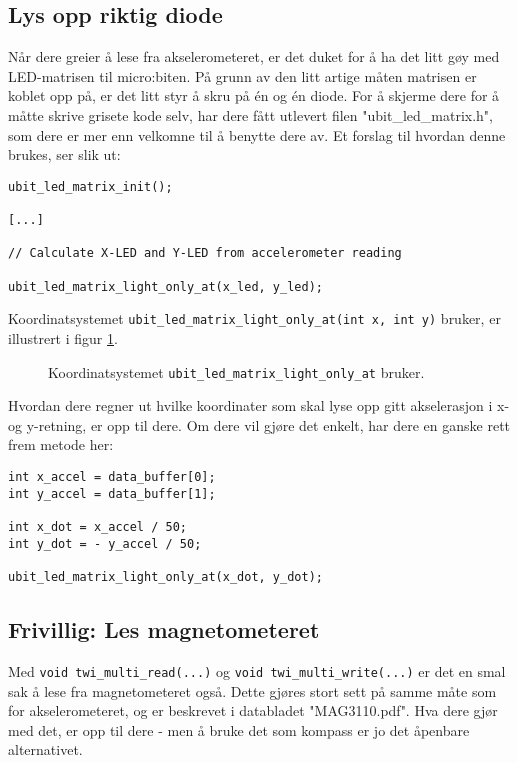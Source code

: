 \documentclass[11pt,a4paper]{article}
\begin{document}
\subsection{Lys opp riktig diode}
Når dere greier å lese fra akselerometeret, er det duket for å ha det litt gøy med LED-matrisen til micro:biten. På grunn av den litt artige måten matrisen er koblet opp på, er det litt styr å skru på én og én diode. For å skjerme dere for å måtte skrive grisete kode selv, har dere fått utlevert filen "ubit\_led\_matrix.h", som dere er mer enn velkomne til å benytte dere av. Et forslag til hvordan denne brukes, ser slik ut:
\begin{verbatim}
ubit_led_matrix_init();

[...]

// Calculate X-LED and Y-LED from accelerometer reading

ubit_led_matrix_light_only_at(x_led, y_led);
\end{verbatim}
Koordinatsystemet \texttt{ubit_led_matrix_light_only_at(int x, int y)} bruker, er illustrert i figur \ref{fig::coordinate_system_led_matrix}.
\begin{figure}[ht]
\centering
{}
\caption{Koordinatsystemet \texttt{ubit_led_matrix_light_only_at} bruker.}
\label{fig::coordinate_system_led_matrix}
\end{figure}
Hvordan dere regner ut hvilke koordinater som skal lyse opp gitt akselerasjon i x- og y-retning, er opp til dere. Om dere vil gjøre det enkelt, har dere en ganske rett frem metode her:
\begin{verbatim}
int x_accel = data_buffer[0];
int y_accel = data_buffer[1];

int x_dot = x_accel / 50;
int y_dot = - y_accel / 50;

ubit_led_matrix_light_only_at(x_dot, y_dot);
\end{verbatim}

\subsection{Frivillig: Les magnetometeret}
Med \texttt{void twi_multi_read(...)} og \texttt{void twi_multi_write(...)} er det en smal sak å lese fra magnetometeret også. Dette gjøres stort sett på samme måte som for akselerometeret, og er beskrevet i databladet "MAG3110.pdf". Hva dere gjør med det, er opp til dere - men å bruke det som kompass er jo det åpenbare alternativet.
\end{document}
